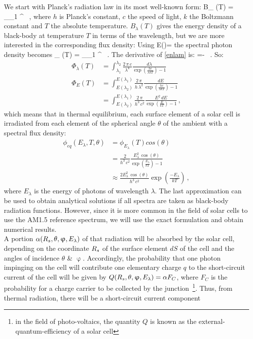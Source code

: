 We start with Planck's radiation law in its most well-known form:
\beq
B_{\lambda} (T) = \int _{\lambda_1} ^{}   \, ,
\eeq
where $h$ is Planck's constant, $c$ the speed of light, $k$ the Boltzmann constant and $T$ the absolute temperature. $B_{\lambda} (T)$ gives the energy density of a black-body at temperature $T$ in terms of the wavelength, but we are more interested in the corresponding flux density: Using
\beq
\label{enlam}
E(\lambda)=
\eeq
the spectral photon density becomes
\beq
\label{photlam}
\Phi_{\lambda} (T) = \int _{\lambda_1} ^{}   \, .
\eeq
The derivative of \eqref{enlam} is:
\beq
{}=- \, .
\eeq
So:
\begin{align}
\Phi_{\lambda} (T) &= \int _{\lambda _1} ^{\lambda _2} \frac{2  \,  \pi  \, c}{\lambda ^4} \frac{d\lambda}{\exp(\frac{hc}{\lambda kT})-1} \\
\Phi_{E} (T)	&=\int _{E(\lambda _2)} ^{E(\lambda_1)} \frac{2 \, \pi }{h \, \lambda ^2} \frac{dE}{\exp(\frac{hc}{\lambda kT})-1} \\
		&=\int _{E(\lambda _2)} ^{E(\lambda_1)} \frac{2  \,  \pi}{h^3 \, c^2} \frac{E ^2 \, dE}{\exp(\frac{E}{kT})-1} \, ,
\end{align}
which means that in thermal equilibrium, each surface element of a solar cell is irradiated from each element of the spherical angle $\theta$ of the ambient with a spectral flux density:
\begin{align}
\phi _{eq} (E_{\lambda},T,\theta)&=\phi_{E_{\lambda}}(T)cos(\theta)\\
				&=\frac{2 }{h^3 \, c^2} \frac{E_{\lambda} ^2 \, \cos (\theta)}{\exp(\frac{E_{\lambda}}{kT})-1} \\
				&\approx \frac{2 E_{\lambda} ^2 \, \cos (\theta)}{h^3 \, c^2} \exp (\frac{-E_{\lambda}}{kT}) \, ,
\end{align}
where $E_{\lambda}$ is the energy of photons of wavelength $\lambda$. The last approximation can be used to obtain analytical solutions if all spectra are taken as black-body radiation functions. However, since it is more common in the field of solar cells to use the AM1.5 reference spectrum, we will use the exact formulation and obtain numerical results.\\
A portion $\alpha (R_s, \theta, \upvarphi, E_{\lambda})$ of that radiation will be absorbed by the solar cell, depending on the coordinate $R_s$ of the surface element $dS$ of the cell and the angles of incidence $\theta$ \& $\upvarphi$. Accordingly, the probability that one photon impinging on the cell will contribute one elementary charge $q$ to the short-circuit current of the cell will be given by $Q(R_s, \theta, \upvarphi, E_{\lambda})=\alpha F_C$, where $F_C$ is the probability for a charge carrier to be collected by the junction~\footnote{in the field of photo-voltaics, the quantity $Q$ is known as the external-quantum-efficiency of a solar cell}. Thus, from thermal radiation, there will be a short-circuit current component
